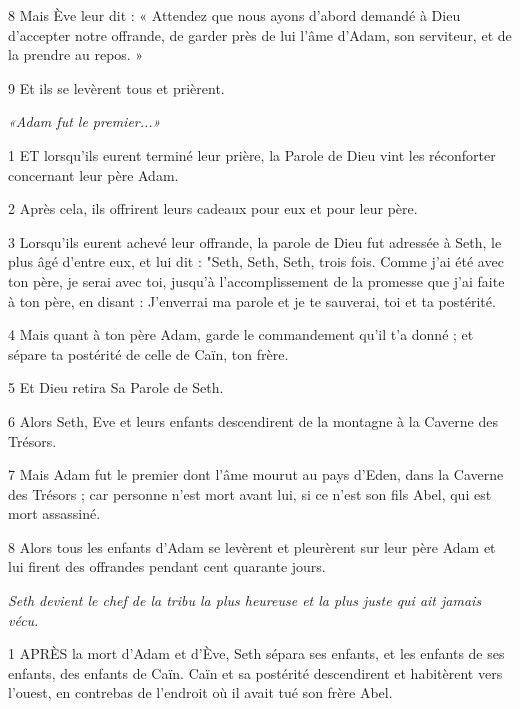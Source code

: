 \par 8 Mais Ève leur dit : « Attendez que nous ayons d'abord demandé à Dieu d'accepter notre offrande, de garder près de lui l'âme d'Adam, son serviteur, et de la prendre au repos. »

\par 9 Et ils se levèrent tous et prièrent.


\par \textit{«Adam fut le premier...»}

\par 1 ET lorsqu'ils eurent terminé leur prière, la Parole de Dieu vint les réconforter concernant leur père Adam.

\par 2 Après cela, ils offrirent leurs cadeaux pour eux et pour leur père.

\par 3 Lorsqu'ils eurent achevé leur offrande, la parole de Dieu fut adressée à Seth, le plus âgé d'entre eux, et lui dit : "Seth, Seth, Seth, trois fois. Comme j'ai été avec ton père, je serai avec toi, jusqu'à l'accomplissement de la promesse que j'ai faite à ton père, en disant : J'enverrai ma parole et je te sauverai, toi et ta postérité.

\par 4 Mais quant à ton père Adam, garde le commandement qu'il t'a donné ; et sépare ta postérité de celle de Caïn, ton frère.

\par 5 Et Dieu retira Sa Parole de Seth.

\par 6 Alors Seth, Eve et leurs enfants descendirent de la montagne à la Caverne des Trésors.

\par 7 Mais Adam fut le premier dont l'âme mourut au pays d'Eden, dans la Caverne des Trésors ; car personne n'est mort avant lui, si ce n'est son fils Abel, qui est mort assassiné.

\par 8 Alors tous les enfants d'Adam se levèrent et pleurèrent sur leur père Adam et lui firent des offrandes pendant cent quarante jours.


\par \textit{Seth devient le chef de la tribu la plus heureuse et la plus juste qui ait jamais vécu.}

\par 1 APRÈS la mort d'Adam et d'Ève, Seth sépara ses enfants, et les enfants de ses enfants, des enfants de Caïn. Caïn et sa postérité descendirent et habitèrent vers l'ouest, en contrebas de l'endroit où il avait tué son frère Abel.

